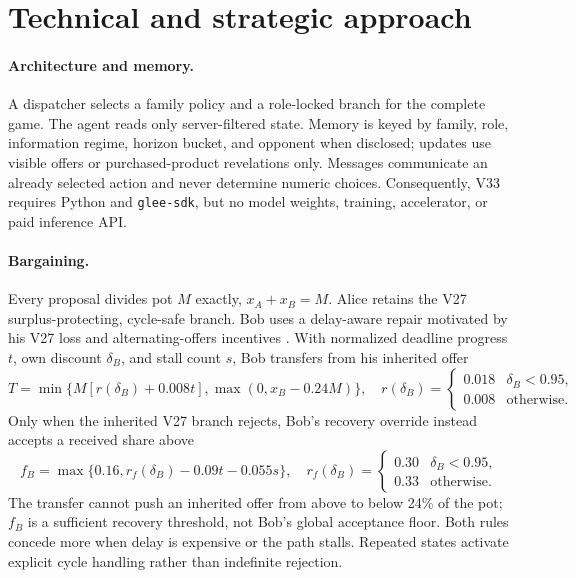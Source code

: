 \section{Technical and strategic approach}

\paragraph{Architecture and memory.}
A dispatcher selects a family policy and a role-locked branch for the complete
game. The agent reads only server-filtered state. Memory is keyed by family,
role, information regime, horizon bucket, and opponent when disclosed; updates
use visible offers or purchased-product revelations only. Messages communicate
an already selected action and never determine numeric choices. Consequently,
V33 requires Python and \texttt{glee-sdk}, but no model weights, training,
accelerator, or paid inference API.

\paragraph{Bargaining.}
Every proposal divides pot $M$ exactly, $x_A+x_B=M$. Alice retains the V27
surplus-protecting, cycle-safe branch. Bob uses a delay-aware repair motivated by
his V27 loss and alternating-offers incentives \citep{rubinstein1982perfect}.
With normalized deadline progress $t$, own discount $\delta_B$,
and stall count $s$, Bob transfers from his inherited offer
\begin{equation}
 T=\min\{M[r(\delta_B)+0.008t],\max(0,x_B-0.24M)\},
 \quad
 r(\delta_B)=\begin{cases}0.018&\delta_B<0.95,\\0.008&\text{otherwise.}\end{cases}
 \label{eq:bob-transfer}
\end{equation}
Only when the inherited V27 branch rejects, Bob's recovery override instead
accepts a received share above
\begin{equation}
 f_B=\max\{0.16,r_f(\delta_B)-0.09t-0.055s\},\quad
 r_f(\delta_B)=\begin{cases}0.30&\delta_B<0.95,\\0.33&\text{otherwise.}\end{cases}
 \label{eq:bob-floor}
\end{equation}
The transfer cannot push an inherited offer from above to below 24\% of the pot;
$f_B$ is a sufficient recovery threshold, not Bob's global acceptance floor.
Both rules concede more when delay is expensive or the path stalls. Repeated
states activate explicit cycle handling rather than indefinite rejection.

